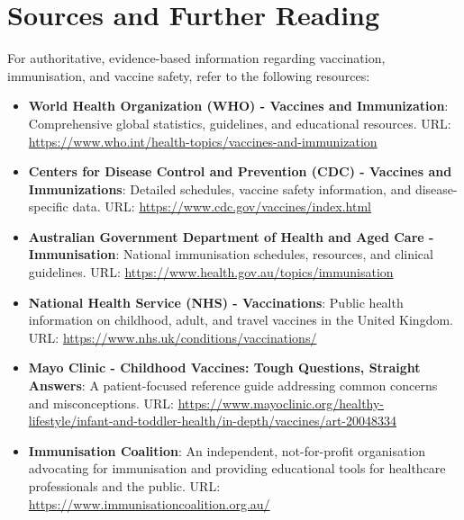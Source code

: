 \section*{Sources and Further Reading}
For authoritative, evidence-based information regarding vaccination, immunisation, and vaccine safety, refer to the following resources:
\begin{itemize}
    \item \textbf{World Health Organization (WHO) - Vaccines and Immunization}: Comprehensive global statistics, guidelines, and educational resources. URL: \url{https://www.who.int/health-topics/vaccines-and-immunization}
    \item \textbf{Centers for Disease Control and Prevention (CDC) - Vaccines and Immunizations}: Detailed schedules, vaccine safety information, and disease-specific data. URL: \url{https://www.cdc.gov/vaccines/index.html}
    \item \textbf{Australian Government Department of Health and Aged Care - Immunisation}: National immunisation schedules, resources, and clinical guidelines. URL: \url{https://www.health.gov.au/topics/immunisation}
    \item \textbf{National Health Service (NHS) - Vaccinations}: Public health information on childhood, adult, and travel vaccines in the United Kingdom. URL: \url{https://www.nhs.uk/conditions/vaccinations/}
    \item \textbf{Mayo Clinic - Childhood Vaccines: Tough Questions, Straight Answers}: A patient-focused reference guide addressing common concerns and misconceptions. URL: \url{https://www.mayoclinic.org/healthy-lifestyle/infant-and-toddler-health/in-depth/vaccines/art-20048334}
    \item \textbf{Immunisation Coalition}: An independent, not-for-profit organisation advocating for immunisation and providing educational tools for healthcare professionals and the public. URL: \url{https://www.immunisationcoalition.org.au/}
\end{itemize}